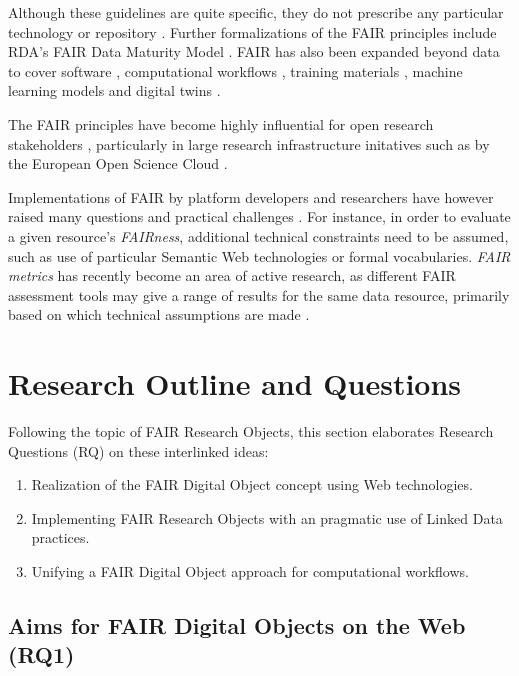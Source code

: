 Although these guidelines are quite specific, they do not prescribe any particular technology or repository \cite{Mons 2017}. Further formalizations of the FAIR principles include RDA's FAIR Data Maturity Model \cite{FAIR Maturity 2020,Bahui 2020}. FAIR has also been expanded beyond data to cover software \cite{Katz 2021b}, computational workflows \cite{Goble 2020}, training materials \cite{Garcia 2020a}, machine learning models \cite{Duarte 2023} and digital twins \cite{Schultes 2022}. 

The FAIR principles have become highly influential for open research stakeholders \cite{Jacobsen 2020}, particularly in large research infrastructure initatives such as by the European Open Science Cloud . 

Implementations of FAIR by platform developers and researchers have however raised many questions and practical challenges \cite{Mons 2020}. 
For instance, in order to evaluate a given resource's \emph{FAIRness}, additional technical constraints need to be assumed, such as use of particular Semantic Web technologies or formal vocabularies. \emph{FAIR metrics} \cite{Wilkinson 2018,Devaraju 2021} has recently become an area of active research, as different FAIR assessment tools may give a range of results for the same data resource, primarily based on which technical assumptions are made \cite{Wilkinson 2022a,Verburg 2023}.


\section{Research Outline and Questions}
\label{intro:outline}

Following the topic of FAIR Research Objects, this section elaborates Research Questions (RQ) on these interlinked ideas:

\begin{enumerate}
    \item Realization of the FAIR Digital Object concept using Web technologies.
    \item Implementing FAIR Research Objects with an pragmatic use of Linked Data practices.
    \item Unifying a FAIR Digital Object approach for computational workflows.
\end{enumerate}


\subsection{Aims for FAIR Digital Objects on the Web (RQ1)}
\label{intro:rq1}

